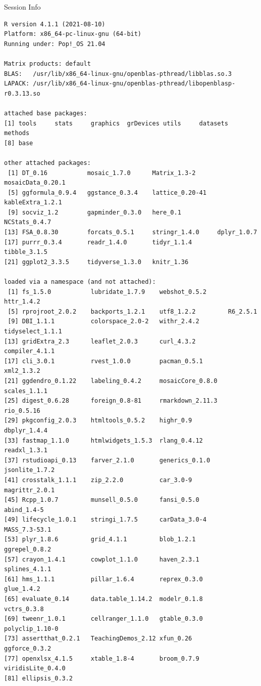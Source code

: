 \documentclass[10pt,handout]{beamer}\usepackage[]{graphicx}\usepackage[]{color}
\makeatletter
\newenvironment{kframe}{%
 \def\at@end@of@kframe{}%
 \ifinner\ifhmode%
  \def\at@end@of@kframe{\end{minipage}}%
  \begin{minipage}{\columnwidth}%
 \fi\fi%
 \def\FrameCommand##1{\hskip\@totalleftmargin \hskip-\fboxsep
 \colorbox{shadecolor}{##1}\hskip-\fboxsep
     \hskip-\linewidth \hskip-\@totalleftmargin \hskip\columnwidth}%
 \MakeFramed {\advance\hsize-\width
   \@totalleftmargin\z@ \linewidth\hsize
   \@setminipage}}%
 {\par\unskip\endMakeFramed%
 \at@end@of@kframe}
\newenvironment{knitrout}{}{} %
\makeatother
\begin{document}
\begin{frame}[fragile]{Session Info}
	\tiny
	
\begin{knitrout}\tiny
{}\color{fgcolor}\begin{kframe}
\begin{verbatim}
R version 4.1.1 (2021-08-10)
Platform: x86_64-pc-linux-gnu (64-bit)
Running under: Pop!_OS 21.04

Matrix products: default
BLAS:   /usr/lib/x86_64-linux-gnu/openblas-pthread/libblas.so.3
LAPACK: /usr/lib/x86_64-linux-gnu/openblas-pthread/libopenblasp-r0.3.13.so

attached base packages:
[1] tools     stats     graphics  grDevices utils     datasets  methods  
[8] base     

other attached packages:
 [1] DT_0.16           mosaic_1.7.0      Matrix_1.3-2      mosaicData_0.20.1
 [5] ggformula_0.9.4   ggstance_0.3.4    lattice_0.20-41   kableExtra_1.2.1 
 [9] socviz_1.2        gapminder_0.3.0   here_0.1          NCStats_0.4.7    
[13] FSA_0.8.30        forcats_0.5.1     stringr_1.4.0     dplyr_1.0.7      
[17] purrr_0.3.4       readr_1.4.0       tidyr_1.1.4       tibble_3.1.5     
[21] ggplot2_3.3.5     tidyverse_1.3.0   knitr_1.36       

loaded via a namespace (and not attached):
 [1] fs_1.5.0           lubridate_1.7.9    webshot_0.5.2      httr_1.4.2        
 [5] rprojroot_2.0.2    backports_1.2.1    utf8_1.2.2         R6_2.5.1          
 [9] DBI_1.1.1          colorspace_2.0-2   withr_2.4.2        tidyselect_1.1.1  
[13] gridExtra_2.3      leaflet_2.0.3      curl_4.3.2         compiler_4.1.1    
[17] cli_3.0.1          rvest_1.0.0        pacman_0.5.1       xml2_1.3.2        
[21] ggdendro_0.1.22    labeling_0.4.2     mosaicCore_0.8.0   scales_1.1.1      
[25] digest_0.6.28      foreign_0.8-81     rmarkdown_2.11.3   rio_0.5.16        
[29] pkgconfig_2.0.3    htmltools_0.5.2    highr_0.9          dbplyr_1.4.4      
[33] fastmap_1.1.0      htmlwidgets_1.5.3  rlang_0.4.12       readxl_1.3.1      
[37] rstudioapi_0.13    farver_2.1.0       generics_0.1.0     jsonlite_1.7.2    
[41] crosstalk_1.1.1    zip_2.2.0          car_3.0-9          magrittr_2.0.1    
[45] Rcpp_1.0.7         munsell_0.5.0      fansi_0.5.0        abind_1.4-5       
[49] lifecycle_1.0.1    stringi_1.7.5      carData_3.0-4      MASS_7.3-53.1     
[53] plyr_1.8.6         grid_4.1.1         blob_1.2.1         ggrepel_0.8.2     
[57] crayon_1.4.1       cowplot_1.1.0      haven_2.3.1        splines_4.1.1     
[61] hms_1.1.1          pillar_1.6.4       reprex_0.3.0       glue_1.4.2        
[65] evaluate_0.14      data.table_1.14.2  modelr_0.1.8       vctrs_0.3.8       
[69] tweenr_1.0.1       cellranger_1.1.0   gtable_0.3.0       polyclip_1.10-0   
[73] assertthat_0.2.1   TeachingDemos_2.12 xfun_0.26          ggforce_0.3.2     
[77] openxlsx_4.1.5     xtable_1.8-4       broom_0.7.9        viridisLite_0.4.0 
[81] ellipsis_0.3.2    
\end{verbatim}
\end{kframe}
\end{knitrout}
	
\end{frame}
\end{document}
